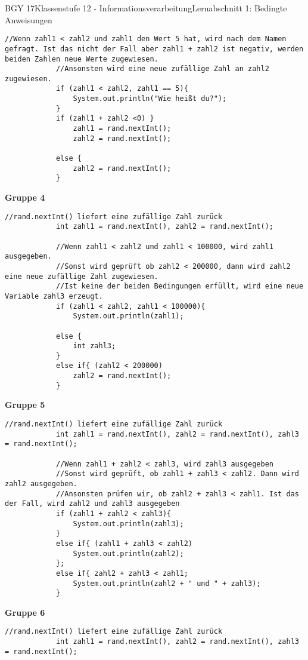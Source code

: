 \documentclass[oneside,openany,headings=optiontotoc,11pt,numbers=noenddot]{scrreprt}
\begin{document}
\begin{worksheet}{BGY 17}{Klassenstufe 12 - Informationsverarbeitung}{Lernabschnitt 1: Bedingte Anweisungen}
\begin{lstlisting}[style=JavaInputStyle]
			//Wenn zahl1 < zahl2 und zahl1 den Wert 5 hat, wird nach dem Namen gefragt. Ist das nicht der Fall aber zahl1 + zahl2 ist negativ, werden beiden Zahlen neue Werte zugewiesen.
			//Ansonsten wird eine neue zufällige Zahl an zahl2 zugewiesen.
			if (zahl1 < zahl2, zahl1 == 5){
				System.out.println("Wie heißt du?");
			}
			if (zahl1 + zahl2 <0) }
				zahl1 = rand.nextInt();
				zahl2 = rand.nextInt();
				
			else {
				zahl2 = rand.nextInt();
			}
		\end{lstlisting}
		\newpage
		\textbf{Gruppe 4}
		\begin{lstlisting}[style=JavaInputStyle]
			//rand.nextInt() liefert eine zufällige Zahl zurück
			int zahl1 = rand.nextInt(), zahl2 = rand.nextInt();
			
			//Wenn zahl1 < zahl2 und zahl1 < 100000, wird zahl1 ausgegeben.
			//Sonst wird geprüft ob zahl2 < 200000, dann wird zahl2 eine neue zufällige Zahl zugewiesen.
			//Ist keine der beiden Bedingungen erfüllt, wird eine neue Variable zahl3 erzeugt.
			if (zahl1 < zahl2, zahl1 < 100000){
				System.out.println(zahl1);
				
			else {
				int zahl3;
			}
			else if{ (zahl2 < 200000)
				zahl2 = rand.nextInt();
			}
		\end{lstlisting}
		\newpage
		\textbf{Gruppe 5}
		\begin{lstlisting}[style=JavaInputStyle]
			//rand.nextInt() liefert eine zufällige Zahl zurück
			int zahl1 = rand.nextInt(), zahl2 = rand.nextInt(), zahl3 = rand.nextInt();
			
			//Wenn zahl1 + zahl2 < zahl3, wird zahl3 ausgegeben
			//Sonst wird geprüft, ob zahl1 + zahl3 < zahl2. Dann wird zahl2 ausgegeben.
			//Ansonsten prüfen wir, ob zahl2 + zahl3 < zahl1. Ist das der Fall, wird zahl2 und zahl3 ausgegeben
			if (zahl1 + zahl2 < zahl3){
				System.out.println(zahl3);
			}
			else if{ (zahl1 + zahl3 < zahl2)
				System.out.println(zahl2);
			};
			else if{ zahl2 + zahl3 < zahl1;
				System.out.println(zahl2 + " und " + zahl3);
			}
		\end{lstlisting}
		\newpage
		\textbf{Gruppe 6}
		\begin{lstlisting}[style=JavaInputStyle]
			//rand.nextInt() liefert eine zufällige Zahl zurück
			int zahl1 = rand.nextInt(), zahl2 = rand.nextInt(), zahl3 = rand.nextInt();
			

\end{lstlisting}
\end{worksheet}
\end{document}
